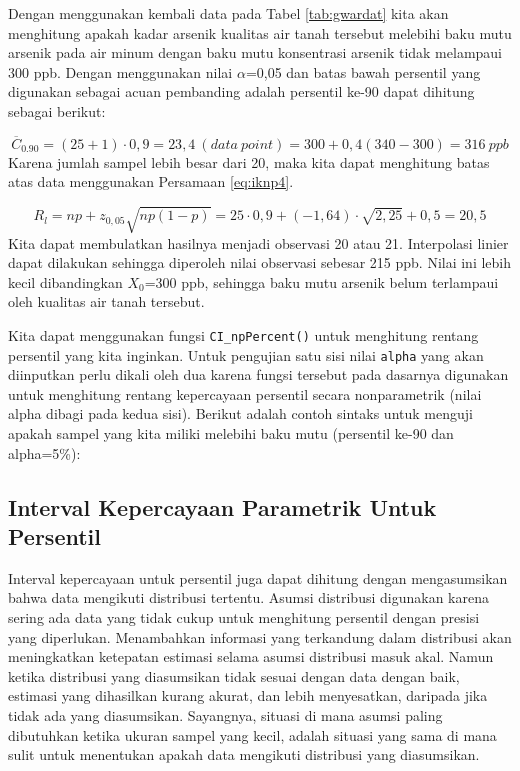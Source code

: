 \documentclass[]{book}
\newenvironment{Shaded}{\begin{snugshade}}{\end{snugshade}}
\newcommand{\KeywordTok}[1]{\textcolor[rgb]{0.13,0.29,0.53}{\textbf{#1}}}
\newcommand{\FloatTok}[1]{\textcolor[rgb]{0.00,0.00,0.81}{#1}}
\newcommand{\OperatorTok}[1]{\textcolor[rgb]{0.81,0.36,0.00}{\textbf{#1}}}
\newcommand{\NormalTok}[1]{#1}
\begin{document}
Dengan menggunakan kembali data pada Tabel \ref{tab:gwardat} kita akan
menghitung apakah kadar arsenik kualitas air tanah tersebut melebihi
baku mutu arsenik pada air minum dengan baku mutu konsentrasi arsenik
tidak melampaui 300 ppb. Dengan menggunakan nilai \(\alpha\)=0,05 dan
batas bawah persentil yang digunakan sebagai acuan pembanding adalah
persentil ke-90 dapat dihitung sebagai berikut:

\[
\overline{C}_{0.90}=\left(25+1\right)\cdot0,9=23,4\ \left(data\ point\right)=300+0,4\left(340-300\right)=316\ ppb
\] Karena jumlah sampel lebih besar dari 20, maka kita dapat menghitung
batas atas data menggunakan Persamaan \eqref{eq:iknp4}.

\[
R_l=np+z_{0,05}\sqrt{np\left(1-p\right)}=25\cdot0,9+\left(-1,64\right)\cdot\sqrt{2,25}+0,5=20,5
\] Kita dapat membulatkan hasilnya menjadi observasi 20 atau 21.
Interpolasi linier dapat dilakukan sehingga diperoleh nilai observasi
sebesar 215 ppb. Nilai ini lebih kecil dibandingkan \(X_0\)=300 ppb,
sehingga baku mutu arsenik belum terlampaui oleh kualitas air tanah
tersebut.

Kita dapat menggunakan fungsi \texttt{CI\_npPercent()} untuk menghitung
rentang persentil yang kita inginkan. Untuk pengujian satu sisi nilai
\texttt{alpha} yang akan diinputkan perlu dikali oleh dua karena fungsi
tersebut pada dasarnya digunakan untuk menghitung rentang kepercayaan
persentil secara nonparametrik (nilai alpha dibagi pada kedua sisi).
Berikut adalah contoh sintaks untuk menguji apakah sampel yang kita
miliki melebihi baku mutu (persentil ke-90 dan alpha=5\%):

\begin{Shaded}
\end{Shaded}

\subsection{Interval Kepercayaan Parametrik Untuk
Persentil}\label{interval-kepercayaan-parametrik-untuk-persentil}

Interval kepercayaan untuk persentil juga dapat dihitung dengan
mengasumsikan bahwa data mengikuti distribusi tertentu. Asumsi
distribusi digunakan karena sering ada data yang tidak cukup untuk
menghitung persentil dengan presisi yang diperlukan. Menambahkan
informasi yang terkandung dalam distribusi akan meningkatkan ketepatan
estimasi selama asumsi distribusi masuk akal. Namun ketika distribusi
yang diasumsikan tidak sesuai dengan data dengan baik, estimasi yang
dihasilkan kurang akurat, dan lebih menyesatkan, daripada jika tidak ada
yang diasumsikan. Sayangnya, situasi di mana asumsi paling dibutuhkan
ketika ukuran sampel yang kecil, adalah situasi yang sama di mana sulit
untuk menentukan apakah data mengikuti distribusi yang diasumsikan.
\end{document}

